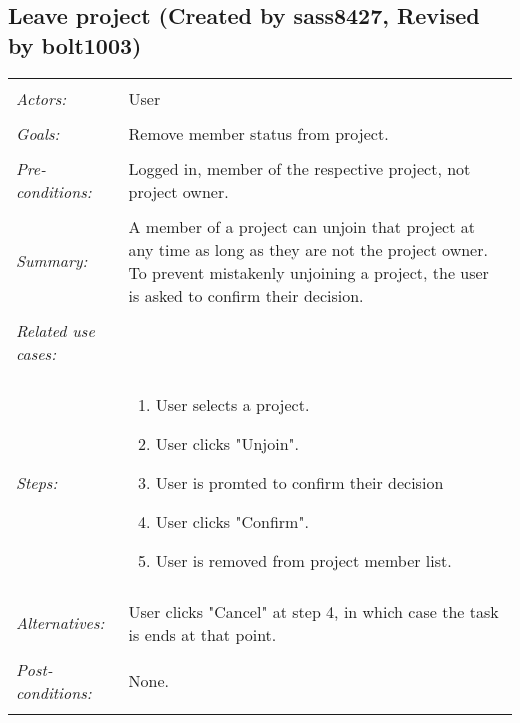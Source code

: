 \documentclass[11pt]{report}
\begin{document}
\subsection{Leave project (Created by sass8427, Revised by bolt1003)}
\begin{tabular}{ p{2cm} p{12cm} }
 \hline
 \\
 \textit{Actors:} & User \\ 
 \\
 \textit{Goals:} & Remove member status from project. \\
 \\
 \textit{Pre-conditions:} & Logged in, member of the respective project, not project owner.  \\
\\
 \textit{Summary:} & A member of a project can unjoin that project at any time as long as they are not the project owner. To prevent mistakenly unjoining a project, the user is asked to confirm their decision.\\ 
 \\
 \textit{Related use cases:} & \\ 
 \\
 \textit{Steps:} & \begin{enumerate}
  \item User selects a project.
  \item User clicks "Unjoin". 
  \item User is promted to confirm their decision
  \item User clicks "Confirm".
  \item User is removed from project member list.    
 \end{enumerate} \\
 \\
 \textit{Alternatives:} & User clicks "Cancel" at step 4, in which case the task is ends at that point. \\
 \\
 \textit{Post-conditions:} & None. \\
 \\
\hline
\end{tabular}
\end{document}
